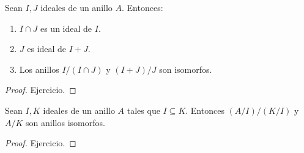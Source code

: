\begin{theorem}
	Sean \(I,J \) ideales de un anillo \(A \). Entonces:
	\begin{enumerate}
		\item \(I \cap J \) es un ideal de \(I \).
		\item \(J \) es ideal de \(I + J \).
		\item Los anillos \(I/(I \cap J)\) y \((I+J)/J \) son isomorfos.
	\end{enumerate}
\end{theorem}
\begin{proof}
	Ejercicio.
\end{proof}
\begin{theorem}
	Sean \(I,K \) ideales de un anillo \(A \) tales que \(I \subseteq K \). Entonces \((A/I)/(K/I )\) y \(A/K \) son anillos isomorfos.
\end{theorem}
\begin{proof}
	Ejercicio.
\end{proof}
